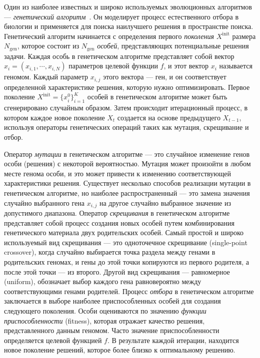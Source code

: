 Один из наиболее известных и широко используемых эволюционных алгоритмов --- \emph{генетический алгоритм}~\cite{holland1975adaptation}. 
Он моделирует процесс естественного отбора в биологии и применяется для поиска наилучшего решения в пространстве поиска.
Генетический алгоритм начинается с определения первого \emph{поколения} $X^{\text{init}}$ размера $N_\text{gen}$, которое состоит из $N_\text{gen}$ \emph{особей}, представляющих потенциальные решения задачи.
Каждая особь в генетическом алгоритме представляет собой вектор $x_i = (x_{i, 1}, \cdots, x_{i, N})$ параметров целевой функции $f$, и этот вектор $x_i$ называется геномом.
Каждый параметр $x_{i, j}$ этого вектора --- ген, и он соответствует определенной характеристике решения, которую нужно оптимизировать.
Первое поколение $X^{\text{init}} = \{x^0_i\}_{i=1}^K$ особей в генетическом алгоритме может быть сгенерировано случайным образом.
Затем происходит итерационный процесс, в котором каждое новое поколение $X_t$ создается на основе предыдущего $X_{t-1}$, используя операторы генетических операций таких как мутация, скрещивание и отбор.

Оператор \emph{мутации} в генетическом алгоритме --- это случайное изменение генов особи (решения) с некоторой вероятностью.
Мутация может произойти в любом месте генома особи, и это может привести к изменению соответствующей характеристики решения.
Существует несколько способов реализации мутации в генетическом алгоритме, но наиболее распространенный --- это замена значения случайно выбранного гена $x_{i, j}$ на другое случайно выбранное значение из допустимого диапазона.
Оператор \emph{скрещивания} в генетическом алгоритме представляет собой процесс создания новых особей путем комбинирования генетического материала двух родительских особей.
Самый простой и широко используемый вид скрещивания --- это одноточечное скрещивание (single-point crossover), когда случайно выбирается точка раздела между генами в родительских геномах, и гены до этой точки копируются из первого родителя, а после этой точки --- из второго.
Другой вид скрещивания --- равномерное (uniform), обозначает выбор каждого гена равновероятно между соответствующими генами родителей.
Процесс \emph{отбора} в генетическом алгоритме заключается в выборе наиболее приспособленных особей для создания следующего поколения.
Особи оцениваются по значению \emph{функции приспособленности} (fitness), которая отражает качество решения, представленного данным геномом.
Часто значение приспособленности определяется целевой функцией $f$.
В результате каждой итерации, находится новое поколение решений, которое более близко к оптимальному решению.

